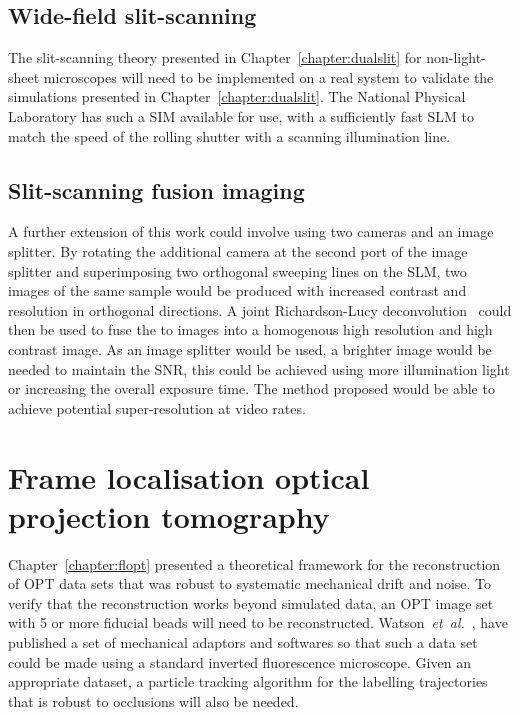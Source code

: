 \subsection{Wide-field slit-scanning}

The slit-scanning theory presented in Chapter~\ref{chapter:dualslit} for non-light-sheet microscopes will need to be implemented on a real system to validate the simulations presented in Chapter~\ref{chapter:dualslit}.
The National Physical Laboratory has such a \gls{SIM} available for use, with a sufficiently fast \gls{SLM} to match the speed of the rolling shutter with a scanning illumination line.

\subsection{Slit-scanning fusion imaging}
A further extension of this work could involve using two cameras and an image splitter.
By rotating the additional camera at the second port of the image splitter and superimposing two orthogonal sweeping lines on the \gls{SLM}, two images of the same sample would be produced with increased contrast and resolution in orthogonal directions.
A joint Richardson-Lucy deconvolution~\cite{ingaramoRichardsonLucyDeconvolution2014} could then be used to fuse the to images into a homogenous high resolution and high contrast image.
As an image splitter would be used, a brighter image would be needed to maintain the \gls{SNR}, this could be achieved using more illumination light or increasing the overall exposure time.
The method proposed would be able to achieve potential super-resolution at video rates.

\section{Frame localisation optical projection tomography}

Chapter~\ref{chapter:flopt} presented a theoretical framework for the reconstruction of \gls{OPT} data sets that was robust to systematic mechanical drift and noise.
To verify that the reconstruction works beyond simulated data, an \gls{OPT} image set with 5 or more fiducial beads will need to be reconstructed.
Watson~\emph{et~al.}~\cite{watsonOPTiMOpticalProjection2017}, have published a set of mechanical adaptors and softwares so that such a data set could be made using a standard inverted fluorescence microscope.
Given an appropriate dataset, a particle tracking algorithm for the labelling trajectories that is robust to occlusions will also be needed.

